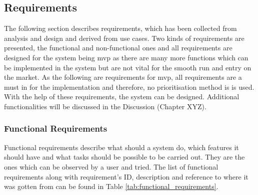 \subsection{Requirements} \label{sec:analysis_requirements}
The following section describes requirements, which has been collected from analysis and design and derived from use cases. Two kinds of requirements are presented, the functional and non-functional ones and all requirements are designed for the system being \acrlong{mvp} as there are many more functions which can be implemented in the system but are not vital for the smooth run and entry on the market. As the following are requirements for \acrshort{mvp}, all requirements are a must in for the implementation and therefore, no prioritisation method is is used. With the help of these requirements, the system can be designed. Additional functionalities will be discussed in the Discussion (Chapter XYZ).

\subsubsection{Functional Requirements} \label{sec:analysis_functionalReqruiements}
Functional requirements describe what should a system do, which features it should have and what tasks should be possible to be carried out. They are the ones which can be observed by a user and tried. The list of functional requirements along with requirement's ID, description and reference to where it was gotten from can be found in Table \ref{tab:functional_requirements}.

